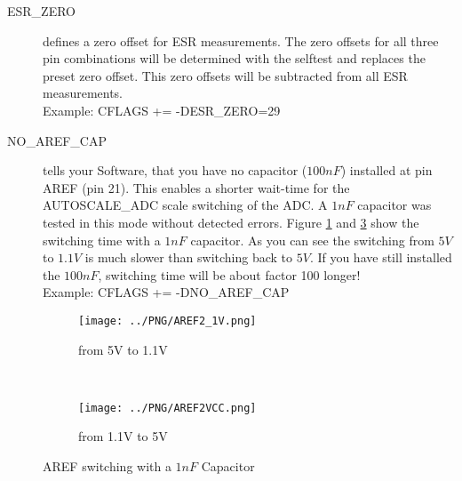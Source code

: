 \begin{description}
  \item[ESR\_ZERO] defines a zero offset for ESR measurements.
The zero offsets for all three pin combinations will be determined with the selftest and replaces the preset zero offset.
This zero offsets will be subtracted from all ESR measurements.\\
Example: CFLAGS += -DESR\_ZERO=29

  \item[NO\_AREF\_CAP] tells your Software, that you have no capacitor (\(100nF\)) installed at pin AREF (pin 21).
This enables a shorter wait-time for the AUTOSCALE\_ADC scale switching of the ADC.
A \(1nF\) capacitor was tested in this mode without detected errors.
Figure \ref{pic:aref1} and \ref{pic:aref5} show the switching time with a \(1nF\) capacitor.
As you can see the switching from \(5V\) to \(1.1V\) is much slower than switching back to \(5V\). If you
have still installed the \(100nF\), switching time will be about factor 100 longer!\\
Example: CFLAGS += -DNO\_AREF\_CAP

\end{description}

\begin{figure}[H]
  \begin{subfigure}[b]{.5\textwidth}
    \centering
    \texttt{[image: ../PNG/AREF2\_1V.png]}
    \caption{from 5V to 1.1V }
    \label{pic:aref1}
  \end{subfigure}
  ~
  \begin{subfigure}[b]{.5\textwidth}
    \centering
    \texttt{[image: ../PNG/AREF2VCC.png]}
    \caption{from 1.1V to 5V}
    \label{pic:aref5}
  \end{subfigure}
  \caption{AREF switching with a \(1nF\) Capacitor}
\end{figure}

